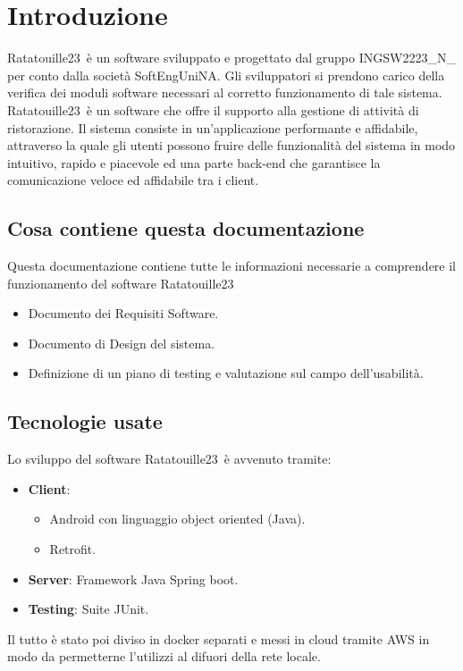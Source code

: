 \section{Introduzione}
Ratatouille23\texttrademark\ è un software sviluppato e progettato dal gruppo INGSW2223\_N\_ per conto dalla società SoftEngUniNA\texttrademark. \newline
Gli sviluppatori si prendono carico della verifica dei moduli software necessari al corretto funzionamento di tale sistema.
Ratatouille23\texttrademark\ è un software che offre il supporto alla gestione di attività di
ristorazione.\newline
Il sistema consiste in un’applicazione performante e affidabile, attraverso la quale gli utenti
possono fruire delle funzionalità del sistema in modo intuitivo, rapido e piacevole ed una parte back-end che garantisce la comunicazione veloce ed affidabile tra i client.

\subsection{Cosa contiene questa documentazione}
Questa documentazione contiene tutte le informazioni necessarie a comprendere il funzionamento del software Ratatouille23\texttrademark
\begin{itemize}
    \item Documento dei Requisiti Software.
    \item Documento di Design del sistema.
    \item Definizione di un piano di testing e valutazione sul campo dell’usabilità.
\end{itemize}

\subsection{Tecnologie usate}
Lo sviluppo del software Ratatouille23\texttrademark \ è avvenuto tramite:
\begin{itemize}
    \item \textbf{Client}:
          \begin{itemize}
              \item Android con linguaggio object oriented (Java).
              \item Retrofit.
          \end{itemize}
    \item \textbf{Server}: Framework Java Spring boot.
    \item \textbf{Testing}: Suite JUnit.
\end{itemize}
Il tutto è stato poi diviso in docker separati e messi in cloud tramite AWS in modo da permetterne l'utilizzi al difuori della rete locale.